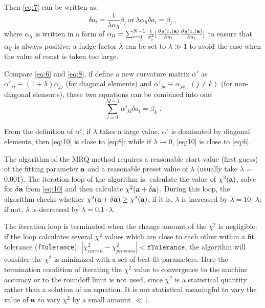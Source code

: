 Then \ref{eq:7} can be written as:
\begin{equation}\label{eq:8}
\delta a_l = \frac{1}{\lambda \alpha_{ll}}\beta_l~\mathrm{or}~\lambda \alpha_{ll}\delta a_l = \beta_l \; , 
\end{equation} 
where $\alpha_{ll}$ is written in a form of $\alpha_{ll}=\sum_{i=0}^{N-1}\frac{1}{\sigma^2_i}[\frac{\partial y(x_i|{\bf a})}{\partial a_l} \frac{\partial y(x_i|{\bf a})}{\partial a_l}]$ to ensure that $\alpha_{ll}$ is always positive; a fudge factor $\lambda$ can be set to $\lambda \gg 1$ to avoid the case when the value of $\mathrm{const}$ is taken too large.

Compare \ref{eq:6} and \ref{eq:8}, if define a new curvature matrix $\alpha'$ as $\alpha'_{jj}\equiv (1+\lambda)\alpha_{jj}$ (for diagonal  elements) and $\alpha'_{jk}\equiv \alpha_{jk}~~~(j\neq k)$ (for non-diagonal elements), these two equations can be combined into one: 
\begin{equation}\label{eq:10}
\sum_{l=0}^{M-1}\alpha'_{kl}\delta a_l = \beta_k \; .
\end{equation}

From the definition of $\alpha'$, if $\lambda$ takes a large value, $\alpha'$ is dominated by diagonal elements, then \ref{eq:10} is close to \ref{eq:8}; while if $\lambda\to0$,  \ref{eq:10} is close to \ref{eq:6}.

The algorithm of the MRQ method requires a reasonable start value (first guess) of the fitting parameter $\bf a$ and a reasonable preset value of $\lambda$ (usually take $\lambda$ = 0.001). 
The iteration loop of the algorithm is: calculate the value of $\chi^2({\bf a})$, solve for $\bf \delta a$ from \ref{eq:10} and then calculate $\chi^2({\bf a+\delta a})$. During this loop, the algorithm checks whether $\chi^2({\bf a+\delta a})\geq\chi^2({\bf a})$, if it is, $\lambda$ is increased by $\lambda=10\cdot\lambda$; if not, $\lambda$ is decreased by $\lambda=0.1\cdot\lambda$.  

The iteration loop is terminated when the change amount of the $\chi^2$ is negligible: if the loop calculates several $\chi^2$ values which are close to each other within a fit tolerance (\texttt{fTolerance}): $|\chi^2_{curren}-\chi^2_{previous}|<\texttt{fTolerance}$, the algorithm will consider the $\chi^2$ is minimized with a set of best-fit parameters. Here the termination condition of iterating the $\chi^2$ value to convergence to the machine
accuracy or to the roundoff limit is not used, since $\chi^2$ is a statistical quantity rather than a solution of an equation. It is not statistical meaningful to vary the value of $\bf a$ to vary $\chi^2$ by a small amount $\ll 1$.

